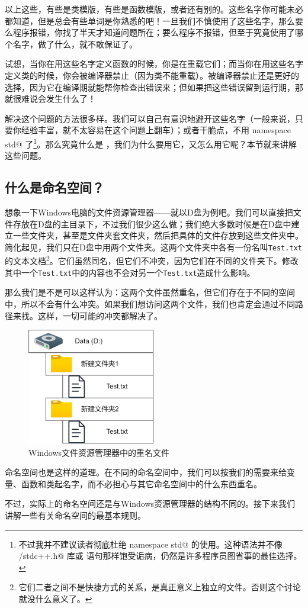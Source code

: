 以上这些，有些是类模版，有些是函数模版，或者还有别的。这些名字你可能未必都知道，但是总会有些单词是你熟悉的吧！一旦我们不慎使用了这些名字，那么要么程序报错，你找了半天才知道问题所在；要么程序不报错，但至于究竟使用了哪个名字，做了什么，就不敢保证了。\par
试想，当你在用这些名字定义函数的时候，你是在重载它们；而当你在用这些名字定义类的时候，你会被编译器禁止（因为类不能重载）。被编译器禁止还是更好的选择，因为它在编译期就能帮你检查出错误来；但如果把这些错误留到运行期，那就很难说会发生什么了！\par
解决这个问题的方法很多样。我们可以自己有意识地避开这些名字（一般来说，只要你经验丰富，就不太容易在这个问题上翻车）；或者干脆点，不用 \lstinline@using namespace std@ 了\footnote{不过我并不建议读者彻底杜绝 \lstinline@using namespace std@ 的使用。这种语法并不像 \lstinline@bits/stdc++.h@ 库或 \lstinline@goto@ 语句那样饱受诟病，仍然是许多程序员图省事的最佳选择。}。那么究竟什么是 \lstinline@namespace@，我们为什么要用它，又怎么用它呢？本节就来讲解这些问题。\par
\subsection*{什么是命名空间？}
想象一下Windows电脑的文件资源管理器——就以D盘为例吧。我们可以直接把文件存放在D盘的主目录下，不过我们很少这么做；我们绝大多数时候是在D盘中建立一些文件夹，甚至是文件夹套文件夹，然后把具体的文件存放到这些文件夹中。简化起见，我们只在D盘中用两个文件夹。这两个文件夹中各有一份名叫\texttt{Test.txt}的文本文档\footnote{它们二者之间不是快捷方式的关系，是真正意义上独立的文件。否则这个讨论就没什么意义了。}。它们虽然同名，但它们不冲突，因为它们在不同的文件夹下。修改其中一个\texttt{Test.txt}中的内容也不会对另一个\texttt{Test.txt}造成什么影响。\par
那么我们是不是可以这样认为：这两个文件虽然重名，但它们存在于不同的空间中，所以不会有什么冲突。如果我们想访问这两个文件，我们也肯定会通过不同路径来找。这样，一切可能的冲突都解决了。\par
\begin{figure}[htbp]
    \centering
    \includegraphics[width=0.5\textwidth]{../images/generalized_parts/07_file_explorer_and_namespaces_300.png}
    \caption{Windows文件资源管理器中的重名文件}
\end{figure}
命名空间也是这样的道理。在不同的命名空间中，我们可以按我们的需要来给变量、函数和类起名字，而不必担心与其它命名空间中的什么东西重名。\par
不过，实际上的命名空间还是与Windows资源管理器的结构不同的。接下来我们讲解一些有关命名空间的最基本规则。\par
